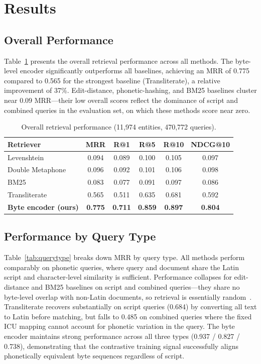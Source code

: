 \documentclass[sigconf]{acmart}
\begin{document}
\section{Results}

\subsection{Overall Performance}

Table~\ref{tab:overall} presents the overall retrieval performance across all methods.
The byte-level encoder significantly outperforms all baselines, achieving an MRR of 0.775
compared to 0.565 for the strongest baseline (Transliterate), a relative improvement of 37\%.
Edit-distance, phonetic-hashing, and BM25 baselines cluster near 0.09 MRR---their low overall scores
reflect the dominance of script and combined queries in the evaluation set, on which these
methods score near zero.

\begin{table}[h]
\centering
\caption{Overall retrieval performance (11,974 entities, 470,772 queries).}
\label{tab:overall}
\begin{tabular}{lccccc}
\toprule
Retriever & MRR & R@1 & R@5 & R@10 & NDCG@10 \\
\midrule
Levenshtein & 0.094 & 0.089 & 0.100 & 0.105 & 0.097 \\
Double Metaphone & 0.096 & 0.092 & 0.101 & 0.106 & 0.098 \\
BM25 & 0.083 & 0.077 & 0.091 & 0.097 & 0.086 \\
Transliterate & 0.565 & 0.511 & 0.635 & 0.681 & 0.592 \\
\textbf{Byte encoder (ours)} & \textbf{0.775} & \textbf{0.711} & \textbf{0.859} & \textbf{0.897} & \textbf{0.804} \\
\bottomrule
\end{tabular}
\end{table}

\subsection{Performance by Query Type}

Table~\ref{tab:querytype} breaks down MRR by query type.
All methods perform comparably on phonetic queries, where query and document share the Latin script and character-level similarity is sufficient. Performance collapses for edit-distance and BM25 baselines on script and combined queries---they share no byte-level overlap with non-Latin documents, so retrieval is essentially random~\cite{chari2025lost}.
Transliterate recovers substantially on script queries (0.684) by converting all text to Latin before matching, but falls to 0.485 on combined queries where the fixed ICU mapping cannot account for phonetic variation in the query. The byte encoder maintains strong performance across all three types (0.937 / 0.827 / 0.738), demonstrating that the contrastive training signal successfully aligns phonetically equivalent byte sequences regardless of script.
\end{document}
